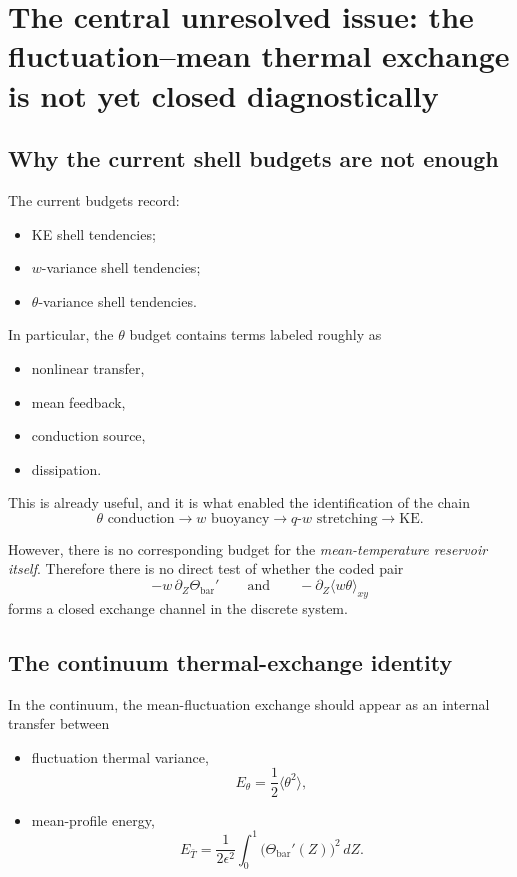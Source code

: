 \documentclass[11pt]{article}
\begin{document}
\section{The central unresolved issue: the fluctuation--mean thermal exchange is not yet closed diagnostically}

\subsection{Why the current shell budgets are not enough}

The current budgets record:

\begin{itemize}
\item KE shell tendencies;
\item $w$-variance shell tendencies;
\item $\theta$-variance shell tendencies.
\end{itemize}

In particular, the $\theta$ budget contains terms labeled roughly as

\begin{itemize}
\item nonlinear transfer,
\item mean feedback,
\item conduction source,
\item dissipation.
\end{itemize}

This is already useful, and it is what enabled the identification of the chain
\[
\theta\text{ conduction} \to w\text{ buoyancy} \to q\text{-}w\text{ stretching} \to \mathrm{KE}.
\]

However, there is no corresponding budget for the \emph{mean-temperature reservoir itself}. Therefore there is no direct test of whether the coded pair
\[
-w\,\partial_Z\Theta_{\mathrm{bar}}'
\qquad\text{and}\qquad
-\partial_Z\langle w\theta\rangle_{xy}
\]
forms a closed exchange channel in the discrete system.

\subsection{The continuum thermal-exchange identity}

In the continuum, the mean-fluctuation exchange should appear as an internal transfer between

\begin{itemize}
\item fluctuation thermal variance,
\[
E_\theta = \frac12 \langle \theta^2 \rangle,
\]
\item mean-profile energy,
\[
E_{\bar T}
=
\frac{1}{2\epsilon^2}\int_0^1 \bigl(\Theta_{\mathrm{bar}}'(Z)\bigr)^2\,dZ.
\]
\end{itemize}
\end{document}
